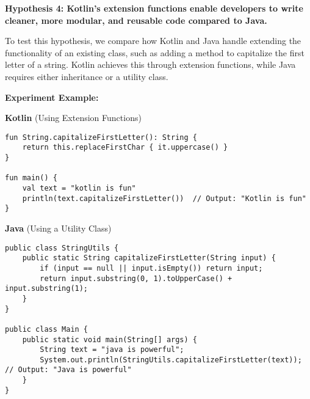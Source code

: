 \noindent \textbf{Hypothesis 4: Kotlin's extension functions enable developers to write cleaner, more modular, and reusable code compared to Java.}

\vspace{1em}

\noindent To test this hypothesis, we compare how Kotlin and Java handle extending the functionality of an existing class, such as adding a method to capitalize the first letter of a string. Kotlin achieves this through extension functions, while Java requires either inheritance or a utility class.

\vspace{1em}

\noindent \textbf{Experiment Example:}  

\begin{tcolorbox}[colframe=blue!80!black, colback=blue!5!white, coltitle=blue!50!black, title={-}, boxrule=0.5mm, sharp corners=south, top=5mm, bottom=5mm, left=5mm, right=5mm]
    \begin{minipage}[t]{0.48\textwidth}
        \raggedright
        \textbf{\scriptsize Kotlin} (\scriptsize Using Extension Functions)
        \vspace{0.2cm}  %
        \begin{lstlisting}[style=kotlin, basicstyle=\fontsize{4}{5}\ttfamily, frame=none]
fun String.capitalizeFirstLetter(): String {
    return this.replaceFirstChar { it.uppercase() }
}

fun main() {
    val text = "kotlin is fun"
    println(text.capitalizeFirstLetter())  // Output: "Kotlin is fun"
}
        \end{lstlisting}
    \end{minipage}%
    \hfill
    \begin{minipage}[t]{0.48\textwidth}
        \raggedright
        \textbf{\scriptsize Java} (\scriptsize Using a Utility Class)
        \vspace{0.2cm}  %
        \begin{lstlisting}[style=java, basicstyle=\fontsize{4}{5}\ttfamily, frame=none]
public class StringUtils {
    public static String capitalizeFirstLetter(String input) {
        if (input == null || input.isEmpty()) return input;
        return input.substring(0, 1).toUpperCase() + input.substring(1);
    }
}

public class Main {
    public static void main(String[] args) {
        String text = "java is powerful";
        System.out.println(StringUtils.capitalizeFirstLetter(text));  // Output: "Java is powerful"
    }
}
        \end{lstlisting}
    \end{minipage}
\end{tcolorbox}

